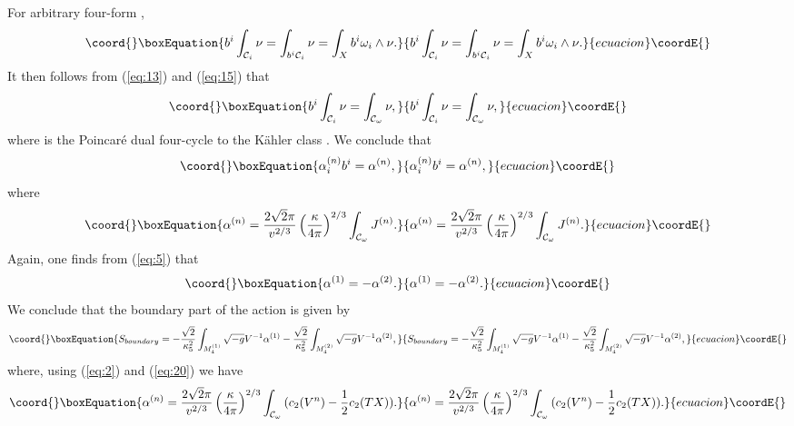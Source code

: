 \documentclass[a4paper,12pt]{article}
\numberwithin{equation}{section}
\theoremstyle{plain}
\begin{document}
For arbitrary four-form \myHighlight{$\nu$}\coordHE{},
%
\begin{equation}\coord{}\boxEquation{
b^{i}\int_{{\cal{C}}_{i}}{\nu}=\int_{b^{i}{\cal{C}}_{i}}{\nu}=\int_{X}{b^{i}
\omega_{i}\wedge \nu}.
\label{eq:17}
}{
b^{i}\int_{{\cal{C}}_{i}}{\nu}=\int_{b^{i}{\cal{C}}_{i}}{\nu}=\int_{X}{b^{i}
\omega_{i}\wedge \nu}.
}{ecuacion}\coordE{}\end{equation}
%
It then follows from (\ref{eq:13}) and (\ref{eq:15}) that
%
\begin{equation}\coord{}\boxEquation{
b^{i}\int_{{\cal{C}}_{i}}{\nu}=\int_{{\cal{C}}_{\omega}}{\nu},
\label{eq:18}
}{
b^{i}\int_{{\cal{C}}_{i}}{\nu}=\int_{{\cal{C}}_{\omega}}{\nu},
}{ecuacion}\coordE{}\end{equation}
%
where \coordHE{} is the Poincar\'e dual four-cycle to the K\"{a}hler
class \myHighlight{$\omega$}\coordHE{}. We conclude that
%
\begin{equation}\coord{}\boxEquation{
\alpha_{i}^{(n)}b^{i}=\alpha^{(n)},
\label{eq:19}
}{
\alpha_{i}^{(n)}b^{i}=\alpha^{(n)},
}{ecuacion}\coordE{}\end{equation}
%
where
%
\begin{equation}\coord{}\boxEquation{
\alpha^{(n)}=\frac{2\sqrt{2}\pi}{v^{2/3}}\left(\frac{\kappa}{4\pi}\right)^{2/3}
\int_{{\cal{C}}_{\omega}}{J^{(n)}}.
\label{eq:20}
}{
\alpha^{(n)}=\frac{2\sqrt{2}\pi}{v^{2/3}}\left(\frac{\kappa}{4\pi}\right)^{2/3}
\int_{{\cal{C}}_{\omega}}{J^{(n)}}.
}{ecuacion}\coordE{}\end{equation}
%
Again, one finds from (\ref{eq:5}) that
%
\begin{equation}\coord{}\boxEquation{
\alpha^{(1)}=-\alpha^{(2)}.
\label{eq:21}
}{
\alpha^{(1)}=-\alpha^{(2)}.
}{ecuacion}\coordE{}\end{equation}
%
We conclude that the boundary part of the action is given by
%
\begin{equation}\coord{}\boxEquation{
S_{boundary}=-\frac{\sqrt{2}}{\kappa_{5}^{2}}\int_{M_{4}^{(1)}}{\sqrt{-g}V^{-1}
\alpha^{(1)}} - \frac{\sqrt{2}}{\kappa_{5}^{2}}\int_{M_{4}^{(2)}}
{\sqrt{-g}V^{-1}\alpha^{(2)}},
\label{eq:22}
}{
S_{boundary}=-\frac{\sqrt{2}}{\kappa_{5}^{2}}\int_{M_{4}^{(1)}}{\sqrt{-g}V^{-1}
\alpha^{(1)}} - \frac{\sqrt{2}}{\kappa_{5}^{2}}\int_{M_{4}^{(2)}}
{\sqrt{-g}V^{-1}\alpha^{(2)}},
}{ecuacion}\coordE{}\end{equation}
%
where, using (\ref{eq:2}) and (\ref{eq:20}) we have
%
\begin{equation}\coord{}\boxEquation{
\alpha^{(n)}=\frac{2\sqrt{2}\pi}{v^{2/3}}\left(\frac{\kappa}{4\pi}\right)^{2/3}
\int_{{\cal{C}}_{\omega}}{(c_{2}(V^{n})-\frac{1}{2}c_{2}(TX))}.
\label{eq:23}
}{
\alpha^{(n)}=\frac{2\sqrt{2}\pi}{v^{2/3}}\left(\frac{\kappa}{4\pi}\right)^{2/3}
\int_{{\cal{C}}_{\omega}}{(c_{2}(V^{n})-\frac{1}{2}c_{2}(TX))}.
}{ecuacion}\coordE{}\end{equation}
\end{document}
